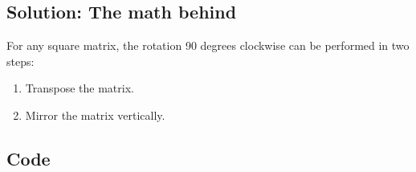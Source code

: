 \documentclass[letterpaper,12pt,english]{book}
\begin{document}
\subsection{Solution: The math behind}
\label{\detokenize{Array/01_ARR_48_Rotate_Image:solution-the-math-behind}}
\sphinxAtStartPar
For any square matrix, the rotation 90 degrees clockwise can be performed in two steps:
\begin{enumerate}
%
\item {} 
\sphinxAtStartPar
Transpose the matrix.

\item {} 
\sphinxAtStartPar
Mirror the matrix vertically.

\end{enumerate}


\subsection{Code}
\label{\detokenize{Array/01_ARR_48_Rotate_Image:code}}
\end{document}
